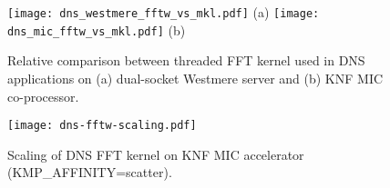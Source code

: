 






\begin{figure}[htp]
\begin{center}
\texttt{[image: dns\_westmere\_fftw\_vs\_mkl.pdf]}
(a)
\texttt{[image: dns\_mic\_fftw\_vs\_mkl.pdf]} 
(b)
\end{center}
\vspace*{-.5cm}
\caption{Relative comparison between threaded FFT kernel
  used in DNS applications on (a) dual-socket Westmere server and (b)
  KNF MIC co-processor.}
\label{fig:mkl-vs-fftw}
\end{figure}

\begin{figure}[h]
\begin{center}
\texttt{[image: dns-fftw-scaling.pdf]}
\end{center}
\vspace*{-.5cm}
\caption{Scaling of DNS FFT kernel on KNF MIC accelerator ({KMP\_AFFINITY=scatter}).}
\label{fig:dns_scaling}
\end{figure}

